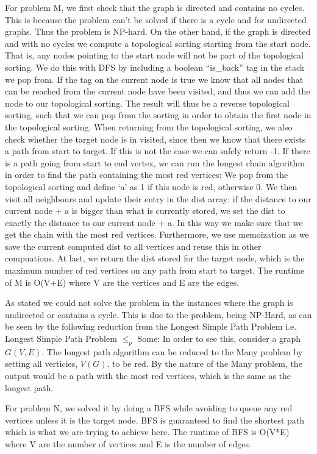 \documentclass[a4paper]{article}
\begin{document}
For problem M, we first check that the graph is directed and contains no cycles. This is because the problem can’t be solved if there is a cycle and for undirected graphs. Thus the problem is NP-hard. On the other hand, if the graph is directed and with no cycles we compute a topological sorting starting from the start node. That is, any nodes pointing to the start node will not
 be part of the topological sorting. We do this with DFS by including a boolean “is\_back” tag in the stack we pop from. If the tag on the current node is true we know that all nodes that can be reached from the current node have been visited, and thus we can add the node to our topological sorting. The result will thus be a reverse topological sorting, 
such that we can pop from the sorting in order to obtain the first node in the topological sorting. When returning from the topological sorting, we also check whether the target node is in visited, since then we know that there exists a path from start to target. If this is not the case we can safely return
 -1. If there is a path going from start to end vertex, we can run the longest chain algorithm in order to find the path containing the most red vertices: We pop from the topological sorting and define ‘a’ as 1 if this node is red, otherwise 0. We then visit all neighbours and update their entry in the dist array: if the distance to our current node + a is bigger
 than what is currently stored, we set the dist to exactly the distance to our current node + a. In this way we make sure that we get the chain with the most red vertices. Furthermore, we use memoization as we save the current computed dist to all vertices and reuse this in other compuations. At last, we return the dist stored for the target node, which is the maximum number of red vertices on any path from start to target. The runtime of M is O(V+E) where V are the vertices and E are the edges.
 
As stated we could not solve the problem in the instances where the graph is undirected or contains a cycle. This is due to the problem, being NP-Hard, as can be seen by the following reduction from the Longest Simple Path Problem i.e. Longest Simple Path Problem $\leq_p$ Some: In order to see this, consider a graph $G(V,E)$. The longest path algorithm can be reduced to the Many problem by setting all verticies, $V(G)$, to be red. By the nature of the Many problem, the output would be a path with the most red vertices, which is the same as the longest path. 

For problem N, we solved it by doing a BFS while avoiding to queue any red vertices unless it is the target node. BFS is guaranteed
to find the shortest path which is what we are trying to achieve here.
The runtime of BFS is O(V*E) where V are the number of vertices and E is the number of edges.
\end{document}

